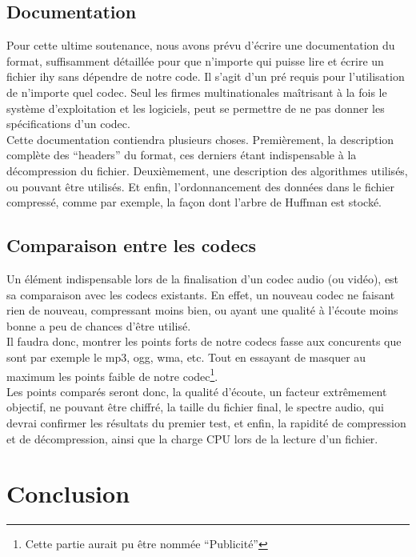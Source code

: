 \documentclass[a4paper,12pt]{article}
\begin{document}
	\subsection{Documentation}
Pour cette ultime soutenance, nous avons prévu d'écrire une documentation du
format, suffisamment détaillée pour que n'importe qui puisse lire et écrire un
fichier ihy sans dépendre de notre code. Il s'agit d'un pré requis pour
l'utilisation de n'importe quel codec. Seul les firmes multinationales
maîtrisant à la fois le système d'exploitation et les logiciels, peut se
permettre de ne pas donner les spécifications d'un codec.\\
Cette documentation contiendra plusieurs choses. Premièrement, la description
complète des ``headers'' du format, ces derniers étant indispensable à la
décompression du fichier. Deuxièmement, une description des algorithmes
utilisés, ou pouvant être utilisés. Et enfin, l'ordonnancement des données dans
le fichier compressé, comme par exemple, la façon dont l'arbre de Huffman est
stocké.
	\subsection{Comparaison entre les codecs}
Un élément indispensable lors de la finalisation d'un codec audio (ou vidéo),
est sa comparaison avec les codecs existants. En effet, un nouveau codec ne
faisant rien de nouveau, compressant moins bien, ou ayant une qualité à l'écoute
moins bonne a peu de chances d'être utilisé.\\
Il faudra donc, montrer les points forts de notre codecs fasse aux concurents
que sont par exemple le mp3, ogg, wma, etc. Tout en essayant de masquer au
maximum les points faible de notre codec\footnote{Cette partie aurait pu être
nommée ``Publicité''}.\\
Les points comparés seront donc, la qualité d'écoute, un facteur extrêmement
objectif, ne pouvant être chiffré, la taille du fichier final, le spectre audio,
qui devrai confirmer les résultats du premier test, et enfin, la rapidité de
compression et de décompression, ainsi que la charge CPU lors de la lecture d'un
fichier.

\newpage

\section*{Conclusion}
\end{document}
